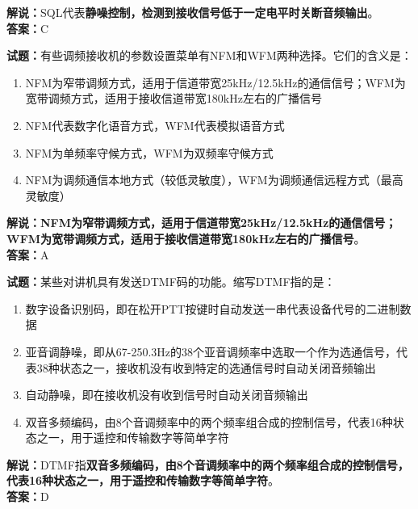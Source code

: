\documentclass{ctexbook}
\begin{document}
\noindent\textbf{解说：}SQL代表\textbf{静噪控制，检测到接收信号低于一定电平时关断音频输出}。\\\noindent\textbf{答案：}C

\vspace{\baselineskip}

\noindent\textbf{试题：}有些调频接收机的参数设置菜单有NFM和WFM两种选择。它们的含义是：

\begin{enumerate}[leftmargin=3em]
  \item NFM为窄带调频方式，适用于信道带宽25\si{\kHz}/12.5\si{\kHz}的通信信号；WFM为宽带调频方式，适用于接收信道带宽180\si{\kHz}左右的广播信号
  \item NFM代表数字化语音方式，WFM代表模拟语音方式
  \item NFM为单频率守候方式，WFM为双频率守候方式
  \item NFM为调频通信本地方式（较低灵敏度），WFM为调频通信远程方式（最高灵敏度）
\end{enumerate}

\noindent\textbf{解说：NFM为窄带调频方式，适用于信道带宽25\si{\kHz}/12.5\si{\kHz}的通信信号；WFM为宽带调频方式，适用于接收信道带宽180\si{\kHz}左右的广播信号}。\\\noindent\textbf{答案：}A

\vspace{\baselineskip}

\noindent\textbf{试题：}某些对讲机具有发送DTMF码的功能。缩写DTMF指的是：

\begin{enumerate}[leftmargin=3em]
  \item 数字设备识别码，即在松开PTT按键时自动发送一串代表设备代号的二进制数据
  \item 亚音调静噪，即从67-250.3Hz的38个亚音调频率中选取一个作为选通信号，代表38种状态之一，接收机没有收到特定的选通信号时自动关闭音频输出
  \item 自动静噪，即在接收机没有收到信号时自动关闭音频输出
  \item 双音多频编码，由8个音调频率中的两个频率组合成的控制信号，代表16种状态之一，用于遥控和传输数字等简单字符
\end{enumerate}

\noindent\textbf{解说：}DTMF指\textbf{双音多频编码，由8个音调频率中的两个频率组合成的控制信号，代表16种状态之一，用于遥控和传输数字等简单字符}。\\\noindent\textbf{答案：}D

\vspace{\baselineskip}
\end{document}
